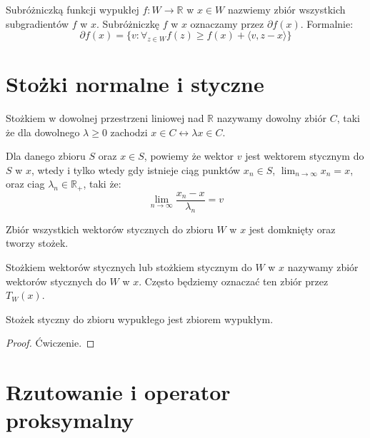 \documentclass[10pt,a4paper,draft]{report}
\begin{document}
\begin{definition}[Subróżniczka]
Subróżniczką funkcji wypukłej $f: W \rightarrow \mathbb{R}$ w $x \in W$ nazwiemy zbiór wszystkich subgradientów $f$ w $x$. Subróżniczkę $f$ w $x$ oznaczamy przez $\partial f(x)$. Formalnie:
\[
\partial f(x) = \{ v : \forall_{z \in W} f(z) \geq f(x) + \langle v, z - x\rangle \}
\]
\end{definition}

\section{Stożki normalne i styczne}

\begin{definition}[Stożka] Stożkiem w dowolnej przestrzeni liniowej nad $\mathbb{R}$ nazywamy dowolny zbiór $C$, taki że dla dowolnego $\lambda \geq 0$ zachodzi $x \in C \leftrightarrow \lambda x \in C$.
\end{definition}

\begin{definition}
Dla danego zbioru $S$ oraz $x \in S$, powiemy że wektor $v$ jest wektorem stycznym do $S$ w $x$, wtedy i tylko wtedy gdy  istnieje ciąg punktów $x_n \in S$, $\lim_{n \rightarrow \infty} x_n = x$, oraz ciag $\lambda_n \in \mathbb{R}_+$, taki że:
\[
\lim_{n \rightarrow \infty} \frac{x_n  - x}{\lambda_n} = v 
\]
\end{definition}

\begin{theorem}
Zbiór wszystkich wektorów stycznych do zbioru $W$ w $x$ jest domknięty oraz tworzy stożek.
\end{theorem}


\begin{definition}
Stożkiem wektorów stycznych lub stożkiem stycznym do $W$ w $x$ nazywamy zbiór wektorów stycznych do $W$ w $x$. Często będziemy oznaczać ten zbiór przez $T_W(x)$.
\end{definition}

\begin{theorem}
Stożek styczny do zbioru wypukłego jest zbiorem wypukłym.
\end{theorem}
\begin{proof}
Ćwiczenie.
\end{proof}

\begin{theorem}
\end{theorem}

\section{Rzutowanie i operator proksymalny}
\end{document}
